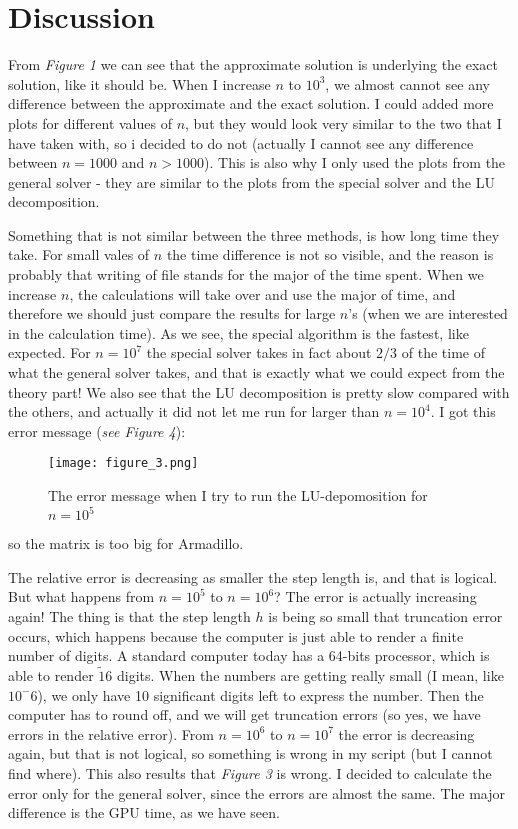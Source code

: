 \documentclass{scrartcl}
\begin{document}
\section{Discussion}
From \textit{Figure 1} we can see that the approximate solution is underlying the exact solution, like it should be. When I increase $n$ to $10^3$, we almost cannot see any difference between the approximate and the exact solution. I could added more plots for different values of $n$, but they would look very similar to the two that I have taken with, so i decided to do not (actually I cannot see any difference between $n=1000$ and $n>1000$). This is also why I only used the plots from the general solver - they are similar to the plots from the special solver and the LU decomposition. \par\vspace{3mm}
Something that is not similar between the three methods, is how long time they take. For small vales of $n$ the time difference is not so visible, and the reason is probably that writing of file stands for the major of the time spent. When we increase $n$, the calculations will take over and use the major of time, and therefore we should just compare the results for large $n$'s (when we are interested in the calculation time). As we see, the special algorithm is the fastest, like expected. For $n=10^7$ the special solver takes in fact about $2/3$ of the time of what the general solver takes, and that is exactly what we could expect from the theory part! We also see that the LU decomposition is pretty slow compared with the others, and actually it did not let me run for larger than $n=10^4$. I got this error message (\textit{see Figure 4}):\par
\begin{figure}[!htbp]
\centering
\texttt{[image: figure\_3.png]}
\caption{The error message when I try to run the LU-depomosition for $n=10^5$ \label{overflow}}
\end{figure}
so the matrix is too big for Armadillo.\par\vspace{3mm}
The relative error is decreasing as smaller the step length is, and that is logical. But what happens from $n=10^5$ to $n=10^6$? The error is actually increasing again! The thing is that the step length $h$ is being so small that truncation error occurs, which happens  because the computer is just able to render a finite number of digits. A standard computer today has a 64-bits processor, which is able to render $\tilde16$ digits. When the numbers are getting really small (I mean, like $10^-6$), we only have 10 significant digits left to express the number. Then the computer has to round off, and we will get truncation errors (so yes, we have errors in the relative error). From $n=10^6$ to $n=10^7$ the error is decreasing again, but that is not logical, so something is wrong in my script (but I cannot find where). This also results that \textit{Figure 3} is wrong. I decided to calculate the error only for the general solver, since the errors are almost the same. The major difference is the GPU time, as we have seen.
\end{document}
